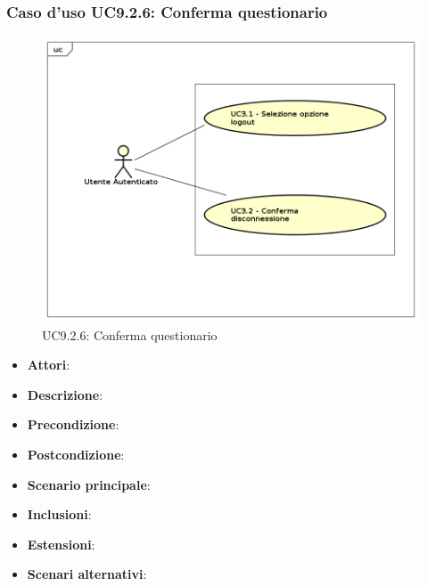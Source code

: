 		\subsubsection{Caso d'uso UC9.2.6: Conferma questionario}
		\label{UC9.2.6}
		\begin{figure}[h]
			\centering
		\includegraphics[scale=0.7,keepaspectratio]{UML/UC9.png}
			\caption{UC9.2.6: Conferma questionario}
		\end{figure}
		\FloatBarrier
		\begin{itemize}
			\item \textbf{Attori}: 
			\item \textbf{Descrizione}: 
			\item \textbf{Precondizione}: 
			\item \textbf{Postcondizione}: 
			\item \textbf{Scenario principale}:
			\item \textbf{Inclusioni}:
			\item \textbf{Estensioni}:
			\item \textbf{Scenari alternativi}:
		\end{itemize}
		
